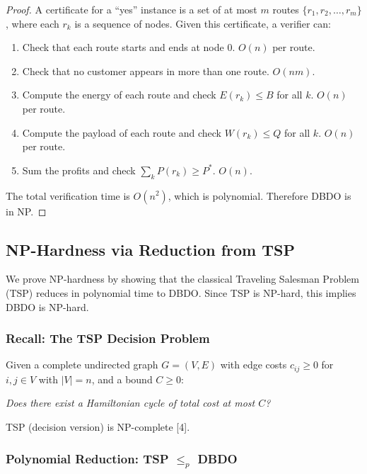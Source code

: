 \documentclass[12pt,a4paper]{article}
\begin{document}
\begin{proof}
A certificate for a ``yes'' instance is a set of at most $m$ routes
$\{r_1, r_2, \ldots, r_m\}$, where each $r_k$ is a sequence of nodes. Given this
certificate, a verifier can:
\begin{enumerate}
  \item Check that each route starts and ends at node 0. \hfill $O(n)$ per route.
  \item Check that no customer appears in more than one route. \hfill $O(nm)$.
  \item Compute the energy of each route and check $E(r_k) \leq B$ for all $k$.
  \hfill $O(n)$ per route.
  \item Compute the payload of each route and check $W(r_k) \leq Q$ for all $k$.
  \hfill $O(n)$ per route.
  \item Sum the profits and check $\sum_k P(r_k) \geq P^*$. \hfill $O(n)$.
\end{enumerate}
The total verification time is $O(n^2)$, which is polynomial. Therefore DBDO is in NP.
\end{proof}

\subsection{NP-Hardness via Reduction from TSP}

We prove NP-hardness by showing that the classical Traveling Salesman Problem (TSP)
reduces in polynomial time to DBDO. Since TSP is NP-hard, this implies DBDO is NP-hard.

\subsubsection{Recall: The TSP Decision Problem}

Given a complete undirected graph $G = (V, E)$ with edge costs $c_{ij} \geq 0$ for
$i,j \in V$ with $|V| = n$, and a bound $C \geq 0$:

\begin{center}
\emph{Does there exist a Hamiltonian cycle of total cost at most $C$?}
\end{center}

TSP (decision version) is NP-complete [4].

\subsubsection{Polynomial Reduction: TSP $\leq_p$ DBDO}
\end{document}
